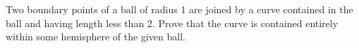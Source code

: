 Two boundary points of a ball of radius 1 are joined by a curve contained in the ball and having length less than 2. Prove that the curve is contained entirely within some hemisphere of the given ball.
